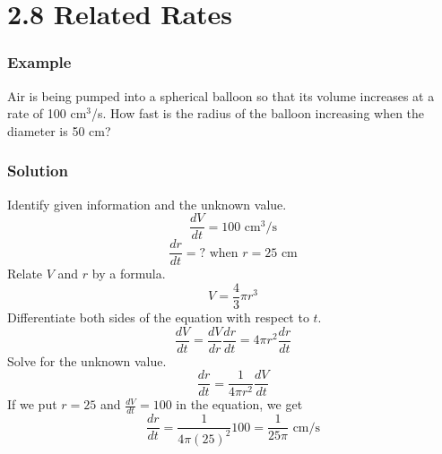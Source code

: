 %
%

\section*{2.8 Related Rates}

\subsubsection*{Example}

Air is being pumped into a spherical balloon so that its volume increases at a rate of 100 cm\(^3\)/s. How fast is the radius of the balloon increasing when the diameter is 50 cm?

\subsubsection*{Solution}

Identify given information and the unknown value.
$$ \frac{dV}{dt} = 100 \text{ cm}^3/\text{s} $$
$$ \frac{dr}{dt} =\text{? when } r = 25 \text{ cm} $$
Relate \(V\) and \(r\) by a formula.
$$ V=\frac{4}{3} \pi r^3 $$
Differentiate both sides of the equation with respect to \(t\).
$$ \frac{dV}{dt}=\frac{dV}{dr}\frac{dr}{dt}=4 \pi r^2 \frac{dr}{dt} $$
Solve for the unknown value.
$$ \frac{dr}{dt} = \frac{1}{4 \pi r^2} \frac{dV}{dt} $$
If we put \(r=25\) and \(\frac{dV}{dt}=100\) in the equation, we get
$$ \frac{dr}{dt} = \frac{1}{4 \pi {(25)}^2}100=\frac{1}{25 \pi} \text{ cm/s} $$ 
